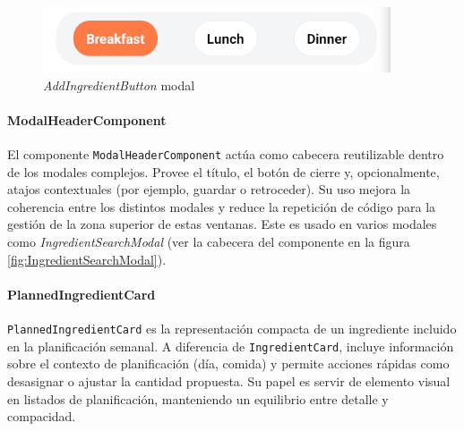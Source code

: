 \documentclass[twoside, openright, 11pt]{report}
\begin{document}
					\begin{figure}[H]
						\centering
						\includegraphics{imagenes/MealPicker.png}
						\caption{\textit{AddIngredientButton} modal}
						\label{fig:MealType}
					\end{figure}

				\paragraph{ModalHeaderComponent\\}
					El componente \texttt{ModalHeaderComponent} actúa como cabecera reutilizable dentro de los modales complejos. Provee el título, el botón de cierre y, opcionalmente, atajos contextuales (por ejemplo, guardar o retroceder). Su uso mejora la coherencia entre los distintos modales y reduce la repetición de código para la gestión de la zona superior de estas ventanas. Este es usado en varios modales como \textit{IngredientSearchModal} (ver la cabecera del componente en la figura \ref{fig:IngredientSearchModal}).
						

				\paragraph{PlannedIngredientCard}
					\texttt{PlannedIngredientCard} es la representación compacta de un ingrediente incluido en la planificación semanal. A diferencia de \texttt{IngredientCard}, incluye información sobre el contexto de planificación (día, comida) y permite acciones rápidas como desasignar o ajustar la cantidad propuesta. Su papel es servir de elemento visual en listados de planificación, manteniendo un equilibrio entre detalle y compacidad.
						
\end{document}
